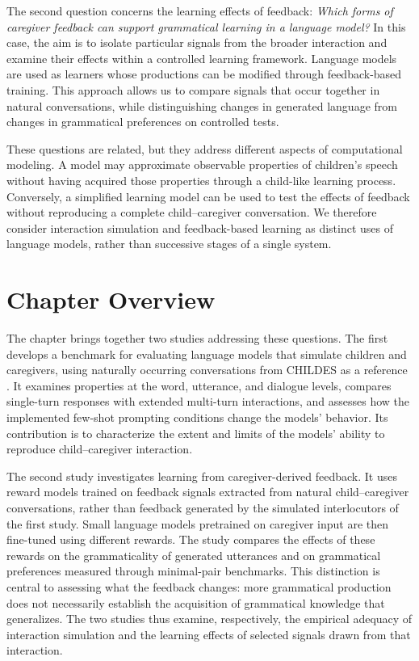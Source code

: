 The second question concerns the learning effects of feedback: \textit{Which forms of caregiver feedback can support grammatical learning in a language model?} In this case, the aim is to isolate particular signals from the broader interaction and examine their effects within a controlled learning framework. Language models are used as learners whose productions can be modified through feedback-based training. This approach allows us to compare signals that occur together in natural conversations, while distinguishing changes in generated language from changes in grammatical preferences on controlled tests.

These questions are related, but they address different aspects of computational modeling. A model may approximate observable properties of children's speech without having acquired those properties through a child-like learning process. Conversely, a simplified learning model can be used to test the effects of feedback without reproducing a complete child--caregiver conversation. We therefore consider interaction simulation and feedback-based learning as distinct uses of language models, rather than successive stages of a single system.

\section{Chapter Overview}

The chapter brings together two studies addressing these questions. The first develops a benchmark for evaluating language models that simulate children and caregivers, using naturally occurring conversations from CHILDES as a reference \citep{macwhinney2000childes}. It examines properties at the word, utterance, and dialogue levels, compares single-turn responses with extended multi-turn interactions, and assesses how the implemented few-shot prompting conditions change the models' behavior. Its contribution is to characterize the extent and limits of the models' ability to reproduce child--caregiver interaction.

The second study investigates learning from caregiver-derived feedback. It uses reward models trained on feedback signals extracted from natural child--caregiver conversations, rather than feedback generated by the simulated interlocutors of the first study. Small language models pretrained on caregiver input are then fine-tuned using different rewards. The study compares the effects of these rewards on the grammaticality of generated utterances and on grammatical preferences measured through minimal-pair benchmarks. This distinction is central to assessing what the feedback changes: more grammatical production does not necessarily establish the acquisition of grammatical knowledge that generalizes. The two studies thus examine, respectively, the empirical adequacy of interaction simulation and the learning effects of selected signals drawn from that interaction.
